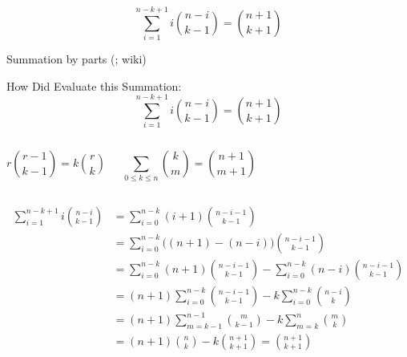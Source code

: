 \begin{frame}{}
  \[
    \sum_{i=1}^{n-k+1} i \binom{n-i}{k-1} = \binom{n+1}{k+1}
  \]

  \vspace{-0.30cm}
  \centerline{Summation by parts (; wiki)}
\end{frame}

\begin{frame}{}
  \begin{exampleblock}{How Did  Evaluate this Summation:}
    \[
      \sum_{i=1}^{n-k+1} i \binom{n-i}{k-1} = \binom{n+1}{k+1}
    \]
  \end{exampleblock}


  \begin{columns}
    \pause
    \pause
    \pause
      \[
	r \binom{r-1}{k-1} = k \binom{r}{k}
      \]

      \vspace{0.30cm}
      \[
	\sum_{0 \le k \le n} \binom{k}{m} = \binom{n+1}{m+1}
      \]
  \end{columns}
\end{frame}

\begin{frame}{}
  \begin{align*}
    \sum_{i=1}^{n-k+1} i \binom{n-i}{k-1} &= \sum_{i=0}^{n-k} (i+1) \binom{n-i-1}{k-1} \\
    &= \sum_{i=0}^{n-k} \big((n+1) - (n-i)\big) \binom{n-i-1}{k-1} \\
    &= \sum_{i=0}^{n-k} (n+1) \binom{n-i-1}{k-1} - \sum_{i=0}^{n-k} (n-i) \binom{n-i-1}{k-1} \\
    &= (n+1) \sum_{i=0}^{n-k}\binom{n-i-1}{k-1} - k \sum_{i=0}^{n-k} \binom{n-i}{k} \\
    &= (n+1) \sum_{m=k-1}^{n-1}\binom{m}{k-1} - k \sum_{m=k}^{n} \binom{m}{k} \\
    &= (n+1) \binom{n}{k} - k \binom{n+1}{k+1} = \binom{n+1}{k+1}
  \end{align*}
\end{frame}

